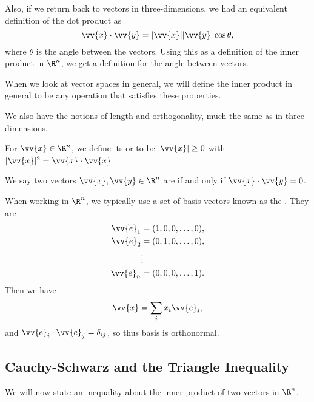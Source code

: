 Also, if we return back to vectors in three-dimensions, we had an equivalent definition of the dot product as
$$
\vv{x} \cdot \vv{y} = |\vv{x}| |\vv{y}| \cos \theta,
$$
where $\theta$ is the angle between the vectors. Using this as a definition of the inner product in $\R^n$, we get a definition for the angle between vectors.

When we look at vector spaces in general, we will define the inner product in general to be any operation that satisfies these properties.

We also have the notions of length and orthogonality, much the same as in three-dimensions.

\begin{definition}
    For $\vv{x} \in \R^n$, we define its  or  to be $|\vv{x}| \geq 0$ with $|\vv{x}|^2 = \vv{x} \cdot \vv{x}$.
\end{definition}

\begin{definition}[Orthogonality]
    We say two vectors $\vv{x}, \vv{y} \in \R^n$ are  if and only if $\vv{x} \cdot \vv{y} = 0$.
\end{definition}

When working in $\R^n$, we typically use a set of basis vectors known as the . They are
\begin{align*}
    \vv{e}_1 &= (1, 0, 0, \dots, 0), \\
    \vv{e}_2 &= (0, 1, 0, \dots, 0), \\
        &\vdots \\
        \vv{e}_n &= (0, 0, 0, \dots, 1).
\end{align*}
Then we have
$$
\vv{x} = \sum_i x_i \vv{e}_i,
$$
and $\vv{e}_i \cdot \vv{e}_j = \delta_{ij}$, so thus basis is orthonormal.

\subsection{Cauchy-Schwarz and the Triangle Inequality}

We will now state an inequality about the inner product of two vectors in $\R^n$.

